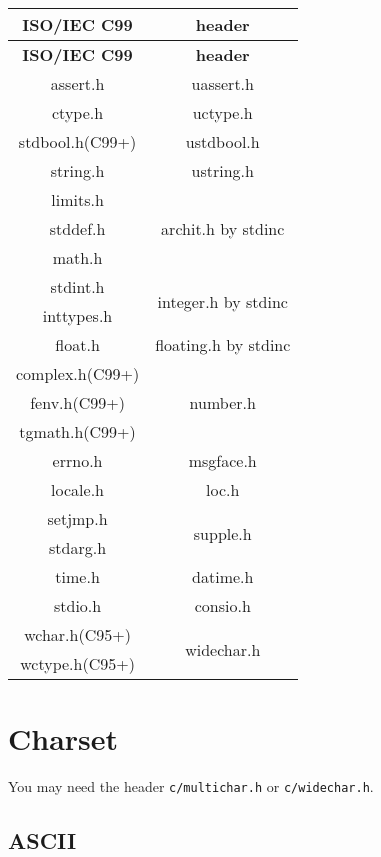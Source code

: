 \begin{center}\begin{longtable}{|c|c|}
		\hline
		\textbf{ISO/IEC C99\cite{StdC99}} & \textbf{header} \\
		\hline\endfirsthead\hline
		\textbf{ISO/IEC C99\cite{StdC99}} & \textbf{header} \\
		\hline\endhead\hline\endfoot\hline\endlastfoot
		assert.h & uassert.h \\\hline
		ctype.h & uctype.h \\\hline
		stdbool.h(C99+) & ustdbool.h \\\hline
		string.h & ustring.h \\\hline
		limits.h & \multirow{3}{*}{archit.h by stdinc} \\\cline{1-1}
		stddef.h & \\\cline{1-1}
		math.h & \\\hline
		stdint.h & \multirow{2}{*}{integer.h by stdinc} \\\cline{1-1}
		inttypes.h & \\\hline
		float.h & floating.h by stdinc \\\hline
		complex.h(C99+) & \multirow{3}{*}{number.h} \\\cline{1-1}
		fenv.h(C99+) & \\\cline{1-1}
		tgmath.h(C99+) & \\\hline
		errno.h & msgface.h \\\hline
		locale.h & loc.h \\\hline
		setjmp.h & \multirow{2}{*}{supple.h} \\\cline{1-1}
		stdarg.h & \\\hline
		time.h & datime.h \\\hline
		stdio.h & consio.h \\\hline
		wchar.h(C95+) & \multirow{2}{*}{widechar.h} \\\cline{1-1}
		wctype.h(C95+) & \\\hline
\end{longtable}\end{center}

\section{Charset}

You may need the header \verb|c/multichar.h| or \verb|c/widechar.h|.

\subsection{ASCII}

